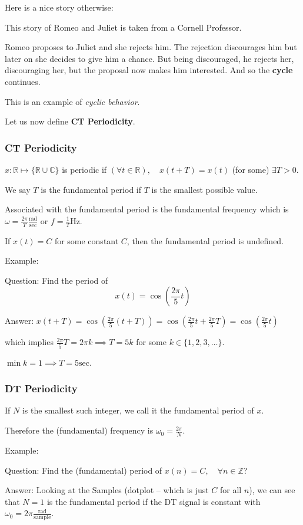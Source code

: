 Here is a nice story otherwise:
\begin{shaded}
This story of Romeo and Juliet is taken from a Cornell Professor.

Romeo proposes to Juliet and she rejects him. The rejection discourages him but later on she decides to give him a chance. But being discouraged, he rejects her, discouraging her, but the proposal now makes him interested. And so the \textbf{cycle} continues.
\end{shaded}
This is an example of \textit{cyclic behavior}.

Let us now define \textbf{CT Periodicity}.
\subsubsection{CT Periodicity}
$x:\mathbb R\mapsto \{\mathbb R \cup \mathbb C\}$ is periodic if $(\forall t\in\mathbb R),\quad x(t+T)=x(t)$ (for some) $\exists T>0 $.

We say $T$ is the fundamental period if $T$ is the smallest possible value.

Associated with the fundamental period is the fundamental frequency which is $\omega = \frac{2\pi}T \frac{\text{rad}}{\text{sec}}$ or $f=\frac1T \text{Hz}$.

If $x(t)=C$ for some constant $C$, then the fundamental period is undefined.

Example:
\begin{shaded}
Question: Find the period of
\[
    x(t)=\cos\left(\frac{2\pi}5 t\right)
\]

Answer: 
$x(t+T)=\cos\left(\frac{2\pi}5 (t+T)\right)=\cos\left(\frac{2\pi}5 t+\frac{2\pi}5 T\right)=\cos\left(\frac{2\pi}5 t\right)$

which implies $\frac{2\pi}5 T = 2\pi k\implies T=5k$ for some $k\in\{1,2,3,\ldots\}$. 

$\min k = 1 \implies T = 5 \text{sec}$.
\end{shaded}

\newpage
\subsubsection{DT Periodicity}
If $N$ is the smallest such integer, we call it the fundamental period of $x$.

Therefore the (fundamental) frequency is $\omega_0=\frac{2\pi}N$.

Example:
\begin{shaded}
Question: Find the (fundamental) period of $x(n)=C, \quad\forall n\in\mathbb Z$?

Answer: 
Looking at the Samples (dotplot -- which is just $C$ for all $n$), we can see that $N= 1$ is the fundamental period if the DT signal is constant with $\omega_0=2\pi\frac{\text{rad}}{\text{sample}}$.
\end{shaded}

